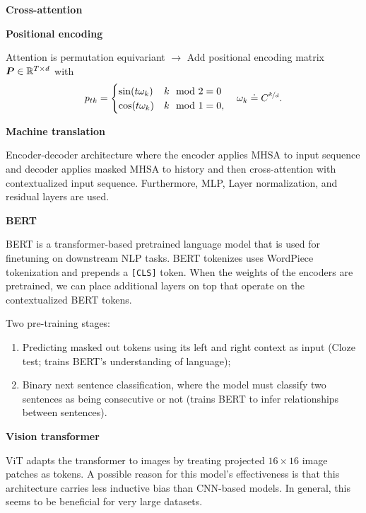 \documentclass[10pt]{article}
\newenvironment{topic}[1]
{\textbf{\sffamily \colorbox{black}{\rlap{\textbf{\textcolor{white}{#1}}}\hspace{\linewidth}\hspace{-2\fboxsep}}}}
{}
\newenvironment{subtopic}[1]
{\begin{center}\textbf{\sffamily #1}\end{center}}
{}
\begin{document}
\begin{multicols*}{3}
\begin{topic}{Transformers}
\begin{subtopic}{Cross-attention}
        \end{subtopic}

        \begin{subtopic}{Positional encoding}
            Attention is permutation equivariant $\to$ Add positional encoding matrix $\bm{P} \in \mathbb{R}^{T \times d}$ with \[
                p_{tk} = \begin{cases}
                    \sin(t \omega_k) & k \mod 2 = 0  \\
                    \cos(t \omega_k) & k \mod 1 = 0,
                \end{cases}
                \quad \omega_k \doteq C^{\nicefrac{k}{d}}.
            \]
        \end{subtopic}

        \begin{subtopic}{Machine translation}
            Encoder-decoder architecture where the encoder applies MHSA to input sequence and decoder
            applies masked MHSA to history and then cross-attention with contextualized input
            sequence. Furthermore, MLP, Layer normalization, and residual layers are used.
        \end{subtopic}

        \begin{subtopic}{BERT}
            BERT is a transformer-based pretrained language model that is used for finetuning on
            downstream NLP tasks. BERT tokenizes uses WordPiece tokenization and prepends a
            \texttt{[CLS]} token. When the weights of the encoders are pretrained, we can place
            additional layers on top that operate on the contextualized BERT tokens.

            Two pre-training stages:
            \begin{enumerate}
                \item Predicting masked out tokens using its left and right context as input (Cloze test; trains BERT's
                      understanding of language);
                \item Binary next sentence classification, where the model must classify two sentences as being
                      consecutive or not (trains BERT to infer relationships between sentences).
            \end{enumerate}
        \end{subtopic}

        \begin{subtopic}{Vision transformer}
            ViT adapts the transformer to images by treating projected $16 \times 16$ image patches
            as tokens. A possible reason for this model's effectiveness is that this architecture
            carries less inductive bias than CNN-based models. In general, this seems to be beneficial
            for very large datasets.
        \end{subtopic}


\end{topic}
\end{multicols*}
\end{document}
